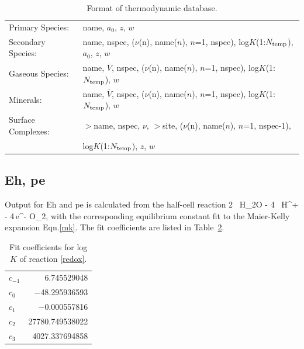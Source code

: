 \begin{table}[h]\centering
\caption{Format of thermodynamic database.}\label{tdatabase}
\vspace{3mm}
\begin{tabular}{ll}
\hline
Primary Species: & name, $a_0$, $z$, $w$\\
Secondary Species: & name, nspec, ($\nu$(n), name($n$), $n$=1, nspec), log$K$(1:$N_{\rm temp}$), $a_0$, $z$, $w$\\
Gaseous Species: & name, $\overline V$, nspec, ($\nu$(n), name($n$), $n$=1, nspec), log$K$(1:$N_{\rm temp}$), $w$ \\
Minerals: & name, $\overline V$, nspec, ($\nu$(n), name($n$), $n$=1, nspec), log$K$(1:$N_{\rm temp}$), $w$\\
Surface Complexes: & $>$name, nspec, $\nu$, $>$site, 
($\nu$(n), name($n$), $n$=1, nspec-1), \\
&\hspace{3in} log$K$(1:$N_{\rm temp}$), $z$, $w$\\
\hline
\end{tabular}
\end{table}

\subsection{Eh, pe}

Output for Eh and pe is calculated from the half-cell reaction
\EQ\label{redox}
\rm 2 \, H_2O - 4 \, H^+ - 4\,e^- \arrows \rm O_2,
\EN
with the corresponding equilibrium constant fit to the Maier-Kelly expansion Eqn.\eqref{mk}. The fit coefficients are listed in Table~\ref{tmkfit}.

\begin{table}[H]\centering
\caption{Fit coefficients for log $K$ of reaction \ref{redox}.}
\label{tmkfit}
\vspace{3mm}
\begin{tabular}{lr}
\toprule
$c_{-1}$ & 6.745529048\\
$c_0$ & $-$48.295936593\\
$c_1$ & $-$0.000557816\\
$c_2$ & 27780.749538022\\
$c_3$ & 4027.337694858\\
\bottomrule
\end{tabular}
\end{table}

